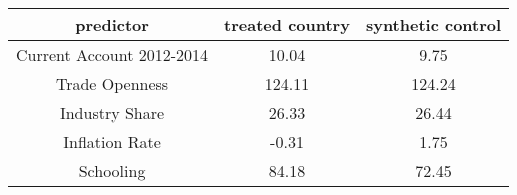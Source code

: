 \begin{tabular}{c|c|c}
predictor&\textbf{treated country}&\textbf{synthetic control}\\
\hline 
Current Account 2012-2014 & 10.04 & 9.75\\
Trade Openness & 124.11 & 124.24\\
Industry Share & 26.33 & 26.44\\
Inflation Rate & -0.31 & 1.75\\
Schooling & 84.18 & 72.45\\
\hline
\end{tabular}